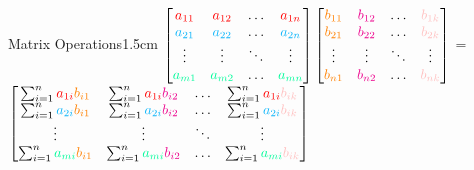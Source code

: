 \begin{ltheorem}{Matrix Operations}{1.5cm}
            {\footnotesize
            $
            \begin{bmatrix}
                {\color{red} a_{11}} & {\color{red} a_{12}}
                                    & \hdots & {\color{red} a_{1n}} \\
                {\color{lblue} a_{21}} & {\color{lblue} a_{22}}
                                    & \hdots & {\color{lblue} a_{2n}} \\
                \vdots & \vdots & \ddots & \vdots \\
                {\color{green} a_{m1}} & {\color{green} a_{m2}}
                                    & \hdots & {\color{green} a_{mn}} \\
            \end{bmatrix}
            \begin{bmatrix}
                {\color{orange} b_{11}} & {\color{magenta} b_{12}}
                                        & \hdots & {\color{pink} b_{1k}} \\
                {\color{orange} b_{21}} & {\color{magenta} b_{22}} 
                                        & \hdots & {\color{pink} b_{2k}} \\
                \vdots & \vdots & \ddots & \vdots \\
                {\color{orange} b_{n1}} & {\color{magenta} b_{n2}}
                                        & \hdots & {\color{pink} b_{nk}} \\
            \end{bmatrix}
            $}
            =
            {\footnotesize
            $
            \begin{bmatrix}
                \sum_{i=1}^n {\color{red} a_{1i}} {\color{orange} b_{i1}}
                & \sum_{i=1}^n {\color{red} a_{1i}} {\color{magenta} b_{i2}}
                & \hdots
                & \sum_{i=1}^n {\color{red} a_{1i}} {\color{pink} b_{ik}} \\

                \sum_{i=1}^n {\color{lblue} a_{2i}} {\color{orange} b_{i1}}
                & \sum_{i=1}^n {\color{lblue} a_{2i}} {\color{magenta} b_{i2}}
                & \hdots
                & \sum_{i=1}^n {\color{lblue} a_{2i}} {\color{pink} b_{ik}} \\
                
                \vdots & \vdots & \ddots & \vdots \\

                \sum_{i=1}^n {\color{green} a_{mi}} {\color{orange} b_{i1}}
                & \sum_{i=1}^n {\color{green} a_{mi}} {\color{magenta} b_{i2}}
                & \hdots
                & \sum_{i=1}^n {\color{green} a_{mi}} {\color{pink} b_{ik}} \\
            \end{bmatrix}$}
    \end{ltheorem}

